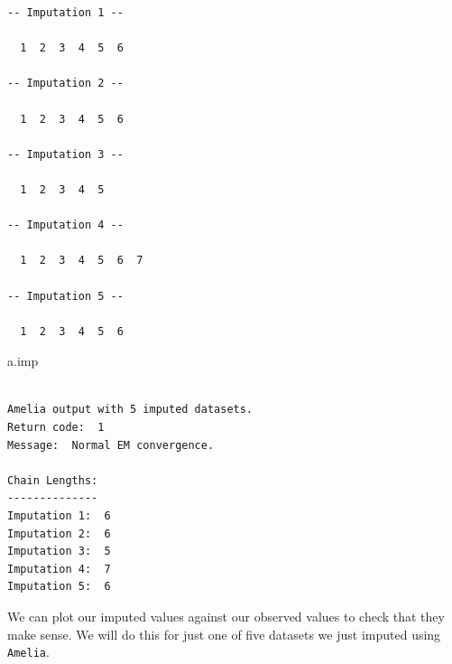 \documentclass[
  letterpaper,
  DIV=11,
  numbers=noendperiod]{scrreprt}
\newenvironment{Shaded}{}{}
\newcommand{\AttributeTok}[1]{\textcolor[rgb]{0.49,0.56,0.16}{#1}}
\newcommand{\ConstantTok}[1]{\textcolor[rgb]{0.53,0.00,0.00}{#1}}
\newcommand{\DecValTok}[1]{\textcolor[rgb]{0.25,0.63,0.44}{#1}}
\newcommand{\DocumentationTok}[1]{\textcolor[rgb]{0.73,0.13,0.13}{\textit{#1}}}
\newcommand{\FloatTok}[1]{\textcolor[rgb]{0.25,0.63,0.44}{#1}}
\newcommand{\FunctionTok}[1]{\textcolor[rgb]{0.02,0.16,0.49}{#1}}
\newcommand{\NormalTok}[1]{#1}
\newcommand{\OtherTok}[1]{\textcolor[rgb]{0.00,0.44,0.13}{#1}}
\newcommand{\SpecialCharTok}[1]{\textcolor[rgb]{0.25,0.44,0.63}{#1}}
\newcommand{\StringTok}[1]{\textcolor[rgb]{0.25,0.44,0.63}{#1}}
\begin{document}
\begin{verbatim}
-- Imputation 1 --

  1  2  3  4  5  6

-- Imputation 2 --

  1  2  3  4  5  6

-- Imputation 3 --

  1  2  3  4  5

-- Imputation 4 --

  1  2  3  4  5  6  7

-- Imputation 5 --

  1  2  3  4  5  6
\end{verbatim}

\begin{Shaded}
\begin{Highlighting}[]
\NormalTok{  a.imp}
\end{Highlighting}
\end{Shaded}

\begin{verbatim}

Amelia output with 5 imputed datasets.
Return code:  1 
Message:  Normal EM convergence. 

Chain Lengths:
--------------
Imputation 1:  6
Imputation 2:  6
Imputation 3:  5
Imputation 4:  7
Imputation 5:  6
\end{verbatim}

We can plot our imputed values against our observed values to check that
they make sense. We will do this for just one of five datasets we just
imputed using \texttt{Amelia}.

\begin{Shaded}
\end{Shaded}
\end{document}
